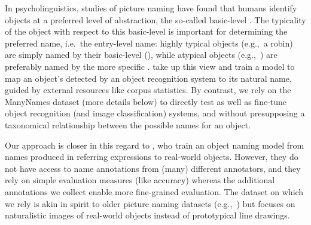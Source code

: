 
%
In psycholinguistics, studies of picture naming have found that humans identify objects at a preferred level of abstraction, the so-called basic-level \cite{rosch1976basic,jolicoeur1984pictures}. 
The typicality of the object with respect to this basic-level \category is important for determining the preferred name, i.e.\ the entry-level name: highly typical objects (e.g.,\ a robin) are simply named by their basic-level \category (), while atypical objects (e.g.,\ ) are preferably named by the more specific \category.
 take up this view and train a model to map an object's \category detected by an object recognition system to its natural name, guided by external resources like corpus statistics.
By contrast, we rely on the ManyNames dataset (more details below) to directly test as well as fine-tune object recognition (and image classification) systems, and without presupposing a taxonomical relationship between the possible names for an object.

Our approach is closer in this regard to , who train an object naming model from names produced in referring expressions to real-world objects.
However, they do not have access to name annotations from (many) different annotators, and they rely on simple evaluation measures (like accuracy) whereas the additional annotations we collect enable more fine-grained evaluation.
The \mn dataset on which we rely is akin in spirit to older picture naming datasets (e.g.,~) but focuses on naturalistic images of real-world objects instead of prototypical line drawings.

